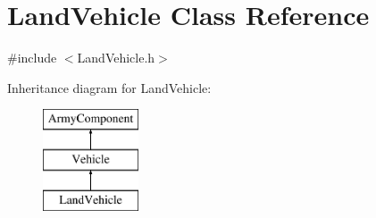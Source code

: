\hypertarget{class_land_vehicle}{}\section{Land\+Vehicle Class Reference}
\label{class_land_vehicle}


{\ttfamily \#include $<$Land\+Vehicle.\+h$>$}

Inheritance diagram for Land\+Vehicle\+:\begin{figure}[H]
\begin{center}
\leavevmode
\includegraphics[height=3.000000cm]{class_land_vehicle}
\end{center}
\end{figure}
